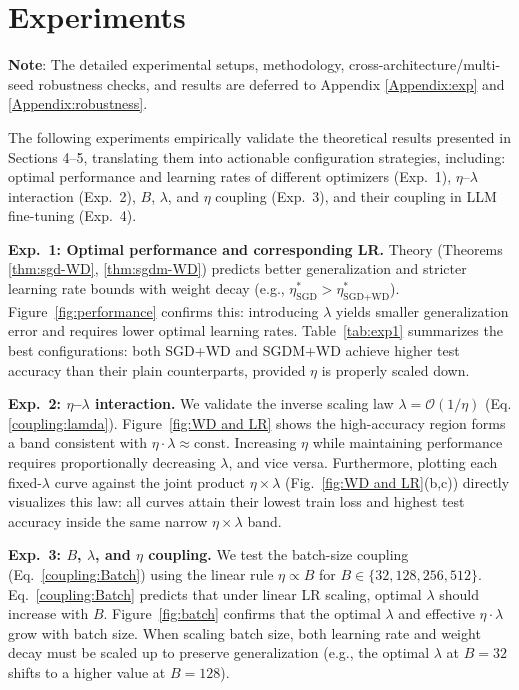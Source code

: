 \section{Experiments}\label{sec:experiments}


\textbf{Note}: The detailed experimental setups, methodology, cross-architecture/multi-seed robustness checks, and results are deferred to Appendix \ref{Appendix:exp} and \ref{Appendix:robustness}.

The following experiments empirically validate the theoretical results presented in Sections 4--5, translating them into actionable configuration strategies, including: optimal performance and learning rates of different optimizers (Exp.~1), $\eta$--$\lambda$ interaction (Exp.~2), $B$, $\lambda$, and $\eta$ coupling (Exp.~3), and their coupling in LLM fine-tuning (Exp.~4).

\textbf{Exp.\ 1: Optimal performance and corresponding LR.}  
Theory (Theorems \ref{thm:sgd-WD}, \ref{thm:sgdm-WD}) predicts better generalization and stricter learning rate bounds with weight decay (e.g., $\eta^*_{\text{SGD}} > \eta^*_{\text{SGD+WD}}$). Figure~\ref{fig:performance} confirms this: introducing $\lambda$ yields smaller generalization error and requires lower optimal learning rates. Table~\ref{tab:exp1} summarizes the best configurations: both SGD+WD and SGDM+WD achieve higher test accuracy than their plain counterparts, provided $\eta$ is properly scaled down.

\textbf{Exp.\ 2: $\eta$--$\lambda$ interaction.} 
We validate the inverse scaling law $\lambda=\mathcal{O}(1/\eta)$ (Eq. \ref{coupling:lamda}).
Figure~\ref{fig:WD and LR} shows the high-accuracy region forms a band consistent with $\eta \cdot \lambda \approx \text{const}$. Increasing $\eta$ while maintaining performance requires proportionally decreasing $\lambda$, and vice versa. Furthermore, plotting each fixed-$\lambda$ curve against the joint product $\eta\times\lambda$ (Fig.~\ref{fig:WD and LR}(b,c)) directly visualizes this law: all curves attain their lowest train loss and highest test accuracy inside the same narrow $\eta\times\lambda$ band.

\textbf{Exp.\ 3: $B$, $\lambda$, and $\eta$ coupling.}
We test the batch-size coupling (Eq.~\ref{coupling:Batch}) using the linear rule $\eta \propto B$ for $B \in \{32, 128, 256, 512\}$. Eq.~\eqref{coupling:Batch} predicts that under linear LR scaling, optimal $\lambda$ should increase with $B$. Figure~\ref{fig:batch} confirms that the optimal $\lambda$ and effective $\eta \cdot \lambda$ grow with batch size. When scaling batch size, both learning rate and weight decay must be scaled up to preserve generalization (e.g., the optimal $\lambda$ at $B{=}32$ shifts to a higher value at $B{=}128$).

